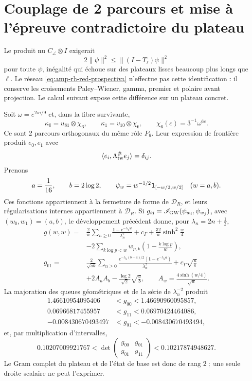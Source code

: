 \section*{Couplage de 2 parcours et mise à l'épreuve contradictoire du plateau}

Le produit nu \(C_\angle\otimes I\) exigerait
\[
 2\|\psi\|^2\leq\|(I-T_\ell)\psi\|^2
\]
pour toute \(\psi\), inégalité qui échoue sur des plateaux lisses beaucoup plus longs que \(\ell\). Le réseau \eqref{eq:amp-rh-red-prospectiva} n'effectue pas cette identification : il conserve les croisements Paley--Wiener, gamma, premier et polaire avant projection. Le calcul suivant expose cette différence sur un plateau concret.

Soit \(\omega=e^{2\pi i/9}\) et, dans la fibre survivante,
\[
 \kappa_0=u_{81}\otimes\chi_6,\qquad
 \kappa_1=v_{10}\otimes\chi_6,\qquad
 \chi_6(c)=3^{-1}\omega^{6c}.
\]
Ce sont \(2\) parcours orthogonaux du même rôle \(P_6\). Leur expression de frontière produit \(e_0,e_1\) avec
\[
 \langle e_i,\Lambda_{\rm tw}^{\#}e_j\rangle=\delta_{ij}.
\]
Prenons
\[
 a=\frac1{16},\qquad b=2\log2,\qquad
 \psi_w=w^{-1/2}{\bf1}_{[-w/2,w/2]}\quad(w=a,b).
\]
Ces fonctions appartiennent à la fermeture de forme de \(\mathcal D_R\), et leurs régularisations internes appartiennent à \(\mathcal D_R\). Si \(g_{ij}=\mathscr I_{\rm GW}(\psi_{w_i},\psi_{w_j})\), avec \((w_0,w_1)=(a,b)\), le développement précédent donne, pour \(\lambda_n=2n+\tfrac12\),
\begin{align}
 g(w,w)
 ={}&\frac2w\sum_{n\geq0}
 \frac{1-e^{-\lambda_nw}}{\lambda_n^2}
 +c_\Gamma+\frac{32}{w}\sinh^2\!\frac w4 \nonumber\\
 &-2\sum_{k\log p<w}
  w_{p,k}\left(1-\frac{k\log p}{w}\right),
 \label{eq:amp-rh-meseta-diagonal}\\
 g_{01}
 ={}&\frac2{\sqrt{ab}}\sum_{n\geq0}
 \frac{e^{-\lambda_n(b-a)/2}(1-e^{-\lambda_na})}{\lambda_n^2}
 +c_\Gamma\sqrt{\frac ab} \nonumber\\
 &+2A_aA_b-\frac{\log2}{\sqrt2}\sqrt{\frac ab},
 \qquad A_w=\frac{4\sinh(w/4)}{\sqrt w}.
 \label{eq:amp-rh-meseta-cruce}
\end{align}
La majoration des queues géométriques et de la série de \(\lambda_n^{-2}\) produit
\begin{align}
 1.46610954095406&<g_{00}<1.46690960095857,\nonumber\\
 0.06966817455957&<g_{11}<0.06970424464086,\nonumber\\
 -0.008430670493497&<g_{01}<-0.008430670493494,
 \label{eq:amp-rh-meseta-cotas}
\end{align}
et, par multiplication d'intervalles,
\begin{equation}\label{eq:amp-rh-meseta-determinante}
 0.10207009921767<
 \det\begin{pmatrix}g_{00}&g_{01}\\g_{01}&g_{11}\end{pmatrix}
 <0.10217874948627.
\end{equation}
Le Gram complet du plateau et de l'état de base est donc de rang \(2\) ; une seule droite scalaire ne peut l'exprimer.

